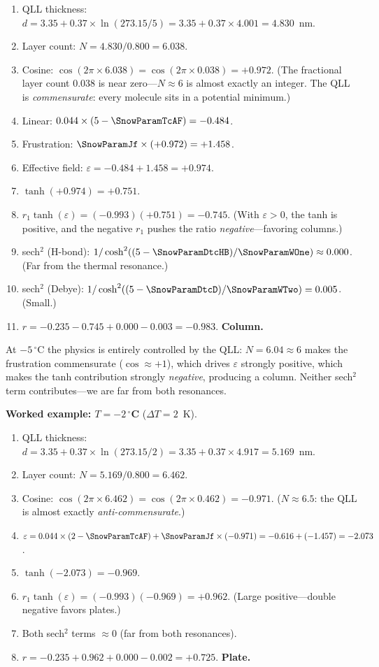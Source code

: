 \documentclass[12pt,letterpaper]{article}
\begin{document}
\begin{enumerate}
\item QLL thickness: $d = 3.35 + 0.37 \times \ln(273.15/5) = 3.35 + 0.37 \times 4.001 = 4.830$~nm.
\item Layer count: $N = 4.830 / 0.800 = 6.038$.
\item Cosine: $\cos(2\pi \times 6.038) = \cos(2\pi \times 0.038) = +0.972$. (The fractional layer count 0.038 is near zero---$N \approx 6$ is almost exactly an integer.  The QLL is \emph{commensurate}: every molecule sits in a potential minimum.)
\item Linear: $0.044 \times (5 - \SnowParamTcAF) = -0.484$.
\item Frustration: $\SnowParamJf \times (+0.972) = +1.458$.
\item Effective field: $\varepsilon = -0.484 + 1.458 = +0.974$.
\item $\tanh(+0.974) = +0.751$.
\item $r_1 \tanh(\varepsilon) = (-0.993)(+0.751) = -0.745$.  (With $\varepsilon > 0$, the tanh is positive, and the negative $r_1$ pushes the ratio \emph{negative}---favoring columns.)
\item sech$^2$ (H-bond): $1/\cosh^2((5 - \SnowParamDtcHB)/\SnowParamWOne) \approx 0.000$. (Far from the thermal resonance.)
\item sech$^2$ (Debye): $1/\cosh^2((5 - \SnowParamDtcD)/\SnowParamWTwo) = 0.005$. (Small.)
\item $r = -0.235 - 0.745 + 0.000 - 0.003 = -0.983$.  \textbf{Column.} \checkmark
\end{enumerate}

At $-5\,{}^\circ$C the physics is entirely controlled by the QLL: $N = 6.04 \approx 6$ makes the frustration commensurate ($\cos \approx +1$), which drives $\varepsilon$ strongly positive, which makes the tanh contribution strongly \emph{negative}, producing a column.  Neither sech$^2$ term contributes---we are far from both resonances.

\medskip
\textbf{Worked example: $T = -2\,{}^\circ$C} ($\Delta T = 2$~K).

\begin{enumerate}
\item QLL thickness: $d = 3.35 + 0.37 \times \ln(273.15/2) = 3.35 + 0.37 \times 4.917 = 5.169$~nm.
\item Layer count: $N = 5.169 / 0.800 = 6.462$.
\item Cosine: $\cos(2\pi \times 6.462) = \cos(2\pi \times 0.462) = -0.971$.  ($N \approx 6.5$: the QLL is almost exactly \emph{anti-commensurate}.)
\item $\varepsilon = 0.044 \times (2 - \SnowParamTcAF) + \SnowParamJf \times (-0.971) = -0.616 + (-1.457) = -2.073$.
\item $\tanh(-2.073) = -0.969$.
\item $r_1 \tanh(\varepsilon) = (-0.993)(-0.969) = +0.962$.  (Large positive---double negative favors plates.)
\item Both sech$^2$ terms $\approx 0$ (far from both resonances).
\item $r = -0.235 + 0.962 + 0.000 - 0.002 = +0.725$.  \textbf{Plate.} \checkmark
\end{enumerate}
\end{document}
